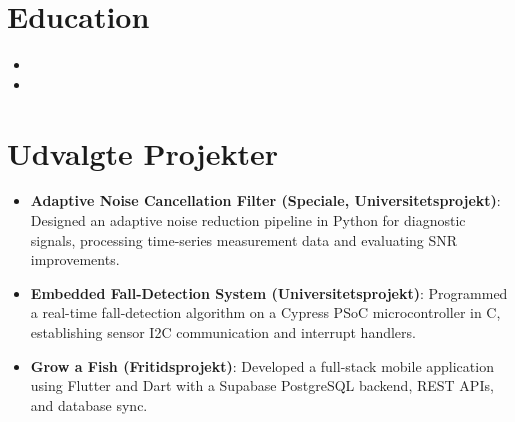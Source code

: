 \documentclass[11pt,a4paper,sans]{moderncv}
\begin{document}

\section{Education}
\vspace{1pt}
\begin{itemize}

\item{}

\vspace{3pt}

\item{}

\end{itemize}


\section{Udvalgte Projekter}
\vspace{1pt}
\begin{itemize}

\item{\textbf{Adaptive Noise Cancellation Filter (Speciale, Universitetsprojekt)}: Designed an adaptive noise reduction pipeline in Python for diagnostic signals, processing time-series measurement data and evaluating SNR improvements.}

\item{\textbf{Embedded Fall-Detection System (Universitetsprojekt)}: Programmed a real-time fall-detection algorithm on a Cypress PSoC microcontroller in C, establishing sensor I2C communication and interrupt handlers.}

\item{\textbf{Grow a Fish (Fritidsprojekt)}: Developed a full-stack mobile application using Flutter and Dart with a Supabase PostgreSQL backend, REST APIs, and database sync.}

\end{itemize}
\end{document}
